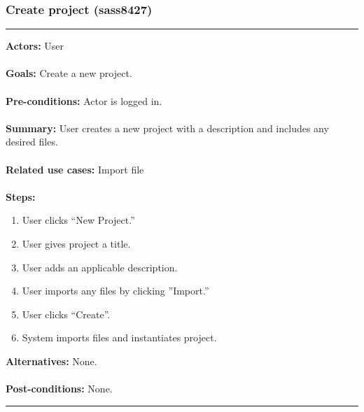 \documentclass[11pt]{report}
\begin{document}
\subsubsection{Create project (sass8427)}
\vspace{2pt}
\hrule
\vspace{8pt}
 \textbf{Actors:} User \\ \\
\textbf{Goals:} Create a new project. \\ \\
 \textbf{Pre-conditions:} Actor is logged in.  \\ \\
\textbf{Summary:} User creates a new project with a description and includes any desired files. \\ \\
\textbf{Related use cases:} Import file \\ \\
\textbf{Steps:} \begin{enumerate}
  \item User clicks ``New Project.''
  \item User gives project a title.
  \item User adds an applicable description.
  \item User imports any files by clicking ''Import.''
  \item User clicks ``Create''.
  \item System imports files and instantiates project.
 \end{enumerate}
 \textbf{Alternatives:} None. \\ \\
 \textbf{Post-conditions:} None. \\
\vspace{8pt}
\hrule
\newpage
\end{document}
